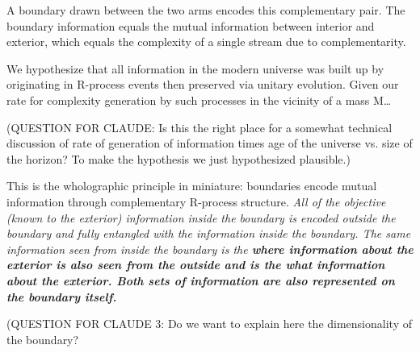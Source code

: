 ﻿\documentclass[12pt]{article}
\begin{document}
A boundary drawn between the two arms encodes this complementary pair. The 
boundary information equals the mutual information between interior and 
exterior, which equals the complexity of a single stream due to complementarity.


We hypothesize that all information in the modern universe was built up by originating in R-process events then preserved via unitary evolution.  Given our rate for complexity generation by such processes in the vicinity of a mass M…


(QUESTION FOR CLAUDE: Is this the right place for a somewhat technical discussion of rate of generation of information times age of the universe vs. size of the horizon?  To make the hypothesis we just hypothesized plausible.)


This is the wholographic principle in miniature: boundaries encode mutual 
information through complementary R-process structure.  \em{All} of the objective (known to the exterior) information inside the boundary is encoded outside the boundary and fully entangled with the information inside the boundary.  The same information seen from inside the boundary is the \bf{where} information about the exterior is also seen from the outside and is the \bf{what} information about the exterior.  Both sets of information are also represented on the boundary itself.


(QUESTION FOR CLAUDE 3: Do we want to explain here the dimensionality of the boundary?
\end{document}
